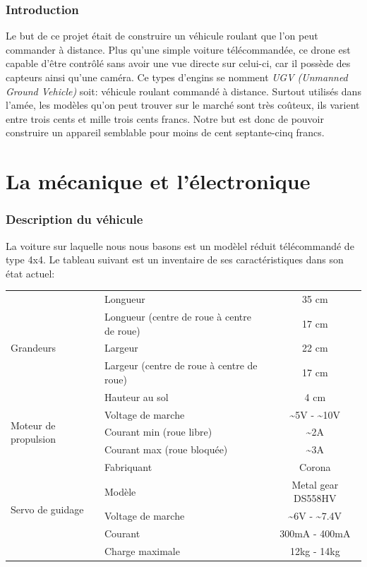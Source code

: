 \documentclass[a4paper,12pt]{article}
\begin{document}
{\section{Introduction}
Le but de ce projet était de construire un véhicule roulant que l'on peut commander à distance. Plus qu'une simple voiture télécommandée, ce drone est capable d'être contrôlé sans avoir une vue directe sur celui-ci, car il possède des capteurs ainsi qu'une caméra. Ce types d'engins se nomment \textit{UGV (Unmanned Ground Vehicle)} soit: véhicule roulant commandé à distance. Surtout utilisés dans l'amée, les modèles qu'on peut trouver sur le marché sont très coûteux, ils varient entre trois cents et mille trois cents francs. Notre but est donc de pouvoir construire un appareil semblable pour moins de cent septante-cinq francs. 

\part{La mécanique et l'électronique}


\section{Description du v\'ehicule \label{TableDesc}}
La voiture sur laquelle nous nous basons est un modèlel r\'eduit
t\'el\'ecommand\'e de type 4x4. Le tableau suivant est un inventaire de 
ses caractéristiques dans son \'etat actuel:

\begin{center}
  \begin{tabular}{|p{4cm}|p{4cm}|c|}
    \hline
    \multirow{5}{*}{Grandeurs}
    &Longueur & 35 cm \\ \cline{2-3}
    &Longueur (centre de roue \`a centre de roue)& 17 cm \\ \cline{2-3}
    &Largeur & 22 cm \\ \cline{2-3}
    &Largeur (centre de roue \`a centre de roue) & 17 cm \\ \cline{2-3}
    & Hauteur au sol & 4 cm\\ \hline
    \multirow{3}{*}{Moteur de propulsion}
    & Voltage de marche & \~{}5V - \~{}10V  \\ \cline{2-3}
    & Courant min (roue libre) & \~{}2A \\ \cline{2-3}
    & Courant max (roue bloqu\'ee) & \~{}3A \\ \hline
    \multirow{5}{*}{Servo de guidage}
    & Fabriquant & Corona \\ \cline{2 - 3}
    & Modèle & Metal gear DS558HV\\ \cline{2-3}
    & Voltage de marche & \~{}6V - \~{}7.4V  \\ \cline{2-3}
    & Courant & 300mA - 400mA \\ \cline{2-3}
    & Charge maximale & 12kg - 14kg \\  
 \hline
	\end{tabular}
\end{center}

}
\end{document}
